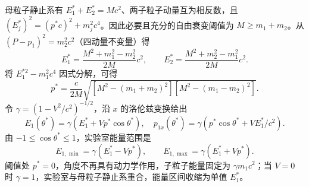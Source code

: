 母粒子静止系有 \(E_1^*+E_2^*=Mc^2\)、两子粒子动量互为相反数，且 \((E_j^*)^2=(p^*c)^2+m_j^2c^4\)。因此必要且充分的自由衰变阈值为 \(M\ge m_1+m_2\)。从 \((P-p_1)^2=m_2^2c^2\)（四动量不变量）得
\[E_1^*=\frac{M^2+m_1^2-m_2^2}{2M}c^2,\qquad E_2^*=\frac{M^2+m_2^2-m_1^2}{2M}c^2.\]
将 \(E_1^{*2}-m_1^2c^4\) 因式分解，可得
\[p^*=\frac{c}{2M}\sqrt{[M^2-(m_1+m_2)^2][M^2-(m_1-m_2)^2]}.\]
令 \(\gamma=(1-V^2/c^2)^{-1/2}\)，沿 \(x\) 的洛伦兹变换给出
\[E_1(\theta^*)=\gamma(E_1^*+Vp^*\cos\theta^*),\quad p_{1x}(\theta^*)=\gamma(p^*\cos\theta^*+VE_1^*/c^2).\]
由 \(-1\le\cos\theta^*\le1\)，实验室能量范围是
\[E_{1,\min}=\gamma(E_1^*-Vp^*),\qquad E_{1,\max}=\gamma(E_1^*+Vp^*).\]
阈值处 \(p^*=0\)，角度不再具有动力学作用，子粒子能量固定为 \(\gamma m_1c^2\)；当 \(V=0\) 时 \(\gamma=1\)，实验室与母粒子静止系重合，能量区间收缩为单值 \(E_1^*\)。
